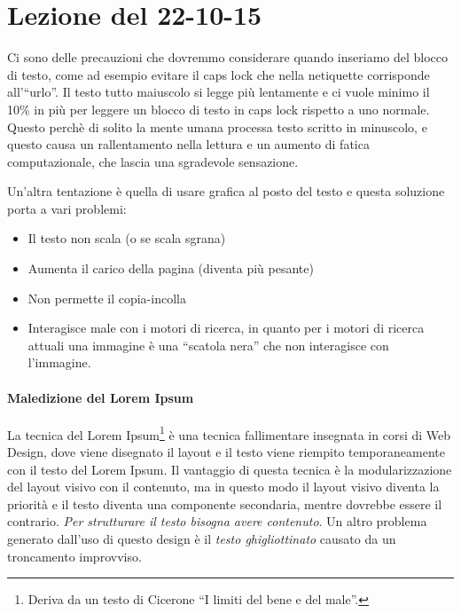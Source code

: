 \section{Lezione del 22-10-15}

Ci sono delle precauzioni che dovremmo considerare quando inseriamo del blocco di testo, come ad esempio evitare il caps lock che nella netiquette corrisponde all'``urlo''. Il testo tutto maiuscolo si legge pi\`u lentamente e ci vuole minimo il 10\% in pi\`u per leggere un blocco di testo in caps lock rispetto a uno normale. Questo perch\`e di solito la mente umana processa testo scritto in minuscolo, e questo causa un rallentamento nella lettura e un aumento di fatica computazionale, che lascia una sgradevole sensazione.

Un'altra tentazione \`e quella di usare grafica al posto del testo e questa soluzione porta a vari problemi:
\begin{itemize}

\item Il testo non scala (o se scala sgrana)
\item Aumenta il carico della pagina (diventa pi\`u pesante)
\item Non permette il copia-incolla
\item Interagisce male con i motori di ricerca, in quanto per i motori di ricerca attuali una immagine \`e una ``scatola nera'' che non interagisce con l'immagine.

\end{itemize}

\paragraph*{Maledizione del Lorem Ipsum} La tecnica del Lorem Ipsum\footnote{Deriva da un testo di Cicerone ``I limiti del bene e del male''.} \`e una tecnica fallimentare insegnata in corsi di Web Design, dove viene disegnato il layout e il testo viene riempito temporaneamente con il testo del Lorem Ipsum. Il vantaggio di questa tecnica \`e la modularizzazione del layout visivo con il contenuto, ma in questo modo il layout visivo diventa la priorit\`a e il testo diventa una componente secondaria, mentre dovrebbe essere il contrario. \textit{Per strutturare il testo bisogna avere contenuto}. Un altro problema generato dall'uso di questo design \`e il \textit{testo ghigliottinato} causato da un troncamento improvviso.

